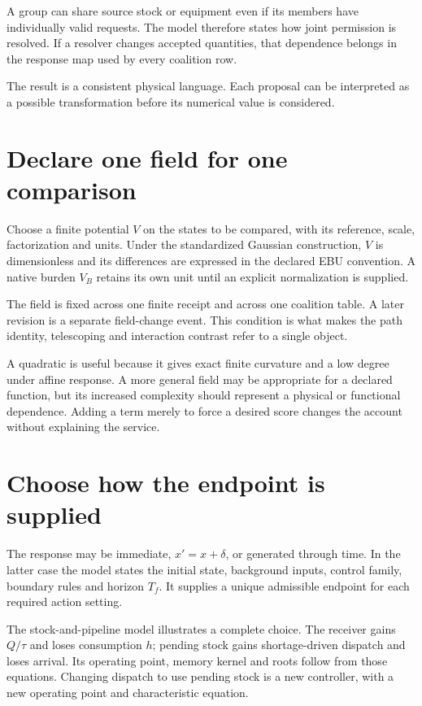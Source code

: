 A group can share source stock or equipment even if its members have individually valid requests. The model therefore states how joint permission is resolved. If a resolver changes accepted quantities, that dependence belongs in the response map used by every coalition row.

The result is a consistent physical language. Each proposal can be interpreted as a possible transformation before its numerical value is considered.

\section{Declare one field for one comparison}
Choose a finite potential $V$ on the states to be compared, with its reference, scale, factorization and units. Under the standardized Gaussian construction, $V$ is dimensionless and its differences are expressed in the declared EBU convention. A native burden $V_B$ retains its own unit until an explicit normalization is supplied.

The field is fixed across one finite receipt and across one coalition table. A later revision is a separate field-change event. This condition is what makes the path identity, telescoping and interaction contrast refer to a single object.

A quadratic is useful because it gives exact finite curvature and a low degree under affine response. A more general field may be appropriate for a declared function, but its increased complexity should represent a physical or functional dependence. Adding a term merely to force a desired score changes the account without explaining the service.

\section{Choose how the endpoint is supplied}
The response may be immediate, $x'=x+\delta$, or generated through time. In the latter case the model states the initial state, background inputs, control family, boundary rules and horizon $T_f$. It supplies a unique admissible endpoint for each required action setting.

The stock-and-pipeline model illustrates a complete choice. The receiver gains $Q/\tau$ and loses consumption $h$; pending stock gains shortage-driven dispatch and loses arrival. Its operating point, memory kernel and roots follow from those equations. Changing dispatch to use pending stock is a new controller, with a new operating point and characteristic equation.

